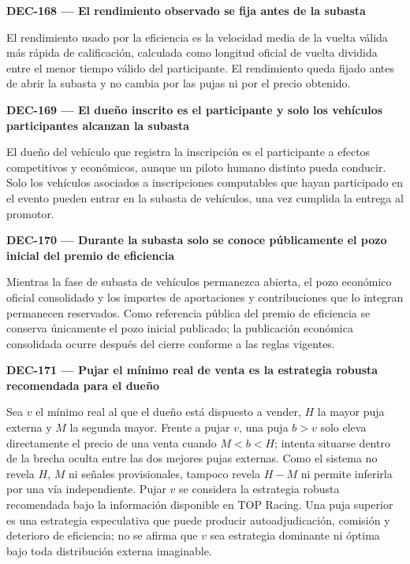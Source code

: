\documentclass[10pt,letterpaper]{article}
\begin{document}
\noindent\textbf{DEC-168 --- El rendimiento observado se fija antes de la subasta}\par
El rendimiento usado por la eficiencia es la velocidad media de la vuelta válida más rápida de calificación, calculada como longitud oficial de vuelta dividida entre el menor tiempo válido del participante. El rendimiento queda fijado antes de abrir la subasta y no cambia por las pujas ni por el precio obtenido.\par\vspace{0.45em}
\noindent\textbf{DEC-169 --- El dueño inscrito es el participante y solo los vehículos participantes alcanzan la subasta}\par
El dueño del vehículo que registra la inscripción es el participante a efectos competitivos y económicos, aunque un piloto humano distinto pueda conducir. Solo los vehículos asociados a inscripciones computables que hayan participado en el evento pueden entrar en la subasta de vehículos, una vez cumplida la entrega al promotor.\par\vspace{0.45em}
\noindent\textbf{DEC-170 --- Durante la subasta solo se conoce públicamente el pozo inicial del premio de eficiencia}\par
Mientras la fase de subasta de vehículos permanezca abierta, el pozo económico oficial consolidado y los importes de aportaciones y contribuciones que lo integran permanecen reservados. Como referencia pública del premio de eficiencia se conserva únicamente el pozo inicial publicado; la publicación económica consolidada ocurre después del cierre conforme a las reglas vigentes.\par\vspace{0.45em}
\noindent\textbf{DEC-171 --- Pujar el mínimo real de venta es la estrategia robusta recomendada para el dueño}\par
Sea $v$ el mínimo real al que el dueño está dispuesto a vender, $H$ la mayor puja externa y $M$ la segunda mayor. Frente a pujar $v$, una puja $b>v$ solo eleva directamente el precio de una venta cuando $M<b<H$; intenta situarse dentro de la brecha oculta entre las dos mejores pujas externas. Como el sistema no revela $H$, $M$ ni señales provisionales, tampoco revela $H-M$ ni permite inferirla por una vía independiente. Pujar $v$ se considera la estrategia robusta recomendada bajo la información disponible en TOP Racing. Una puja superior es una estrategia especulativa que puede producir autoadjudicación, comisión y deterioro de eficiencia; no se afirma que $v$ sea estrategia dominante ni óptima bajo toda distribución externa imaginable.\par\vspace{0.45em}
\end{document}
